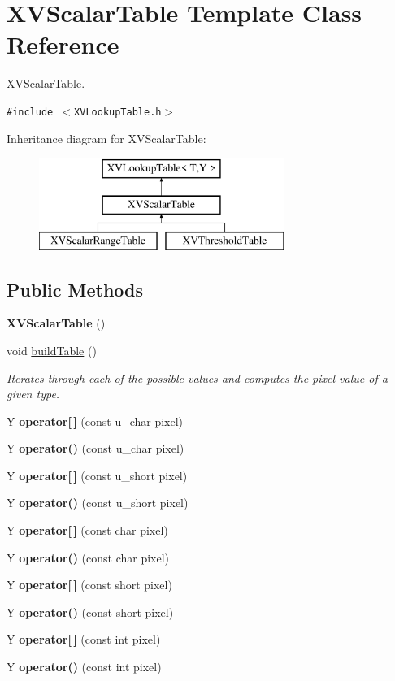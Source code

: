 \hypertarget{class_XVScalarTable}{
\section{XVScalar\-Table  Template Class Reference}
\label{XVScalarTable}
}
XVScalar\-Table. 


{\tt \#include $<$XVLookup\-Table.h$>$}

Inheritance diagram for XVScalar\-Table:\begin{figure}[H]
\begin{center}
\leavevmode
\includegraphics[height=3cm]{class_XVScalarTable}
\end{center}
\end{figure}
\subsection*{Public Methods}
\begin{CompactItemize}
\item 
{\bf XVScalar\-Table} ()
\item 
void \hyperlink{class_XVScalarTable_a1}{build\-Table} ()
\begin{CompactList}\small\item\em Iterates through each of the possible values and computes the pixel value of a given type.\item\end{CompactList}\item 
Y {\bf operator\mbox{[}$\,$\mbox{]}} (const u\_\-char pixel)
\item 
Y {\bf operator()} (const u\_\-char pixel)
\item 
Y {\bf operator\mbox{[}$\,$\mbox{]}} (const u\_\-short pixel)
\item 
Y {\bf operator()} (const u\_\-short pixel)
\item 
Y {\bf operator\mbox{[}$\,$\mbox{]}} (const char pixel)
\item 
Y {\bf operator()} (const char pixel)
\item 
Y {\bf operator\mbox{[}$\,$\mbox{]}} (const short pixel)
\item 
Y {\bf operator()} (const short pixel)
\item 
Y {\bf operator\mbox{[}$\,$\mbox{]}} (const int pixel)
\item 
Y {\bf operator()} (const int pixel)
\end{CompactItemize}
